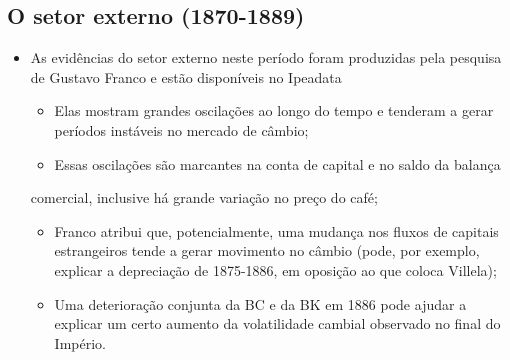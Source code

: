 \documentclass[a4paper,12pt]{article}[abntex2]
\begin{document}
\subsection{\textbf{O setor externo (1870-1889)}}
\begin{itemize}
    \item  As evidências do setor externo neste período foram produzidas pela pesquisa
de Gustavo Franco e estão disponíveis no Ipeadata
\begin{itemize}
    \item Elas mostram grandes oscilações ao longo do tempo e tenderam a gerar períodos instáveis no mercado de câmbio;
\end{itemize}
\begin{itemize}
    \item Essas oscilações são marcantes na conta de capital e no saldo da balança
\end{itemize}
comercial, inclusive há grande variação no preço do café;
\begin{itemize}
    \item Franco atribui que, potencialmente, uma mudança nos fluxos de capitais estrangeiros tende a gerar movimento no câmbio (pode, por exemplo, explicar a depreciação de 1875-1886, em oposição ao que coloca Villela);
\end{itemize}
\begin{itemize}
    \item Uma deterioração conjunta da BC e da BK em 1886 pode ajudar a explicar um certo aumento da volatilidade cambial observado no final do Império.
\end{itemize}
\end{itemize}
\end{document}
